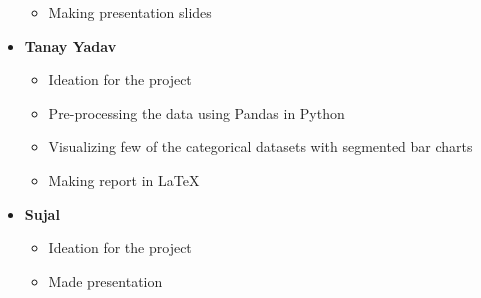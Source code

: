 \documentclass[12pt,onecolumn,letterpaper]{article}
\begin{document}
\begin{itemize}
\begin{itemize}
        \item Making presentation slides
    \end{itemize}
    \item \textbf{Tanay Yadav}
    \begin{itemize}
        \item Ideation for the project
        \item Pre-processing the data using Pandas in Python
        \item Visualizing few of the categorical datasets with segmented bar charts
        \item Making report in \LaTeX
    \end{itemize}
    \item \textbf{Sujal}
     \begin{itemize}
        \item Ideation for the project
        \item Made presentation
        
    \end{itemize}
\end{itemize}
\end{document}
